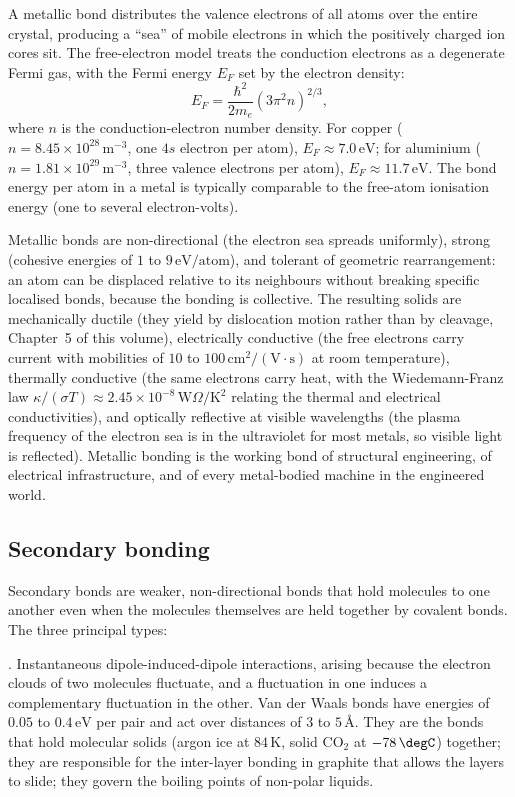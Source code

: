 A metallic bond distributes the valence electrons of all atoms over
the entire crystal, producing a ``sea'' of mobile electrons in which
the positively charged ion cores sit. The free-electron model treats
the conduction electrons as a degenerate Fermi gas, with the
Fermi energy $E_F$ set by the electron density:
\[
E_F = \frac{\hbar^2}{2 m_e} (3\pi^2 n)^{2/3},
\]
where $n$ is the conduction-electron number density. For copper
($n = 8.45 \times 10^{28}\,\text{m}^{-3}$, one $4s$ electron per atom),
$E_F \approx 7.0\,\text{eV}$; for aluminium ($n = 1.81 \times 10^{29}\,
\text{m}^{-3}$, three valence electrons per atom), $E_F \approx 11.7\,
\text{eV}$. The bond energy per atom in a metal is typically
comparable to the free-atom ionisation energy (one to several
electron-volts).

Metallic bonds are non-directional (the electron sea spreads
uniformly), strong (cohesive energies of $1$ to $9\,\text{eV}/\text{atom}$),
and tolerant of geometric rearrangement: an atom can be displaced
relative to its neighbours without breaking specific localised bonds,
because the bonding is collective. The resulting solids are
mechanically ductile (they yield by dislocation motion rather than by
cleavage, Chapter~5 of this volume), electrically conductive (the
free electrons carry current with mobilities of $10$ to $100\,
\text{cm}^2/(\text{V}\cdot\text{s})$ at room temperature), thermally
conductive (the same electrons carry heat, with the
Wiedemann-Franz law $\kappa/(\sigma T) \approx 2.45 \times 10^{-8}\,
\text{W}\Omega/\si{\kelvin}^2$ relating the thermal and electrical
conductivities), and optically reflective at visible wavelengths (the
plasma frequency of the electron sea is in the ultraviolet for most
metals, so visible light is reflected). Metallic bonding is the
working bond of structural engineering, of electrical infrastructure,
and of every metal-bodied machine in the engineered world.

\subsection{Secondary bonding}

Secondary bonds are weaker, non-directional bonds that hold molecules
to one another even when the molecules themselves are held together
by covalent bonds. The three principal types:

. Instantaneous dipole-induced-dipole
interactions, arising because the electron clouds of two molecules
fluctuate, and a fluctuation in one induces a complementary fluctuation
in the other. Van der Waals bonds have energies of $0.05$ to $0.4\,
\text{eV}$ per pair and act over distances of $3$ to $5\,
\si{\angstrom}$. They are the bonds that hold molecular solids (argon
ice at $84\,\si{\kelvin}$, solid CO$_2$ at $-78\,\degC$) together; they
are responsible for the inter-layer bonding in graphite that allows the
layers to slide; they govern the boiling points of non-polar liquids.

